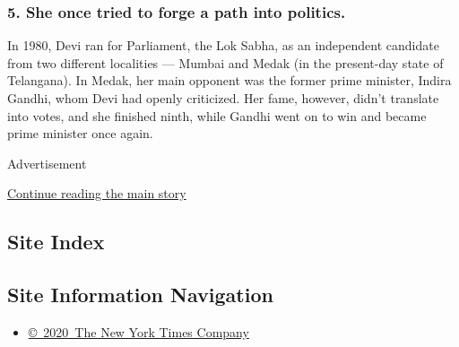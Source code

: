 \hypertarget{5-she-once-tried-to-forge-a-path-into-politics}{%
\subsubsection{\texorpdfstring{\textbf{5. She once tried to forge a path
into
politics.}}{5. She once tried to forge a path into politics.}}\label{5-she-once-tried-to-forge-a-path-into-politics}}

In 1980, Devi ran for Parliament, the Lok Sabha, as an independent
candidate from two different localities --- Mumbai and Medak (in the
present-day state of Telangana). In Medak, her main opponent was the
former prime minister, Indira Gandhi, whom Devi had openly criticized.
Her fame, however, didn't translate into votes, and she finished ninth,
while Gandhi went on to win and became prime minister once again.

Advertisement

\protect\hyperlink{after-bottom}{Continue reading the main story}

\hypertarget{site-index}{%
\subsection{Site Index}\label{site-index}}

\hypertarget{site-information-navigation}{%
\subsection{Site Information
Navigation}\label{site-information-navigation}}

\begin{itemize}
\tightlist
\item
  \href{https://help.nytimes.com/hc/en-us/articles/115014792127-Copyright-notice}{©~2020~The
  New York Times Company}
\end{itemize}

